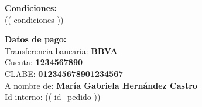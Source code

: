\documentclass[12pt]{article}
\begin{document}
\vspace{1cm}

\textbf{Condiciones:} \\[0.3cm]
(( condiciones ))



\vspace{1cm}

\textbf{Datos de pago:} \\[0.3cm]
Transferencia bancaria: \textbf{BBVA} \\
Cuenta: \textbf{1234567890} \\
CLABE: \textbf{012345678901234567} \\
A nombre de: \textbf{María Gabriela Hernández Castro} \\

\vfill
{\tiny Id interno: (( id_pedido ))}
\end{document}
